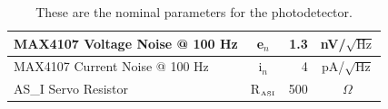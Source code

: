 \begin{table}[!h]
\begin{center}
\begin{tabular}{|l|c|r|c|}
MAX4107 Voltage Noise @ 100 Hz     & e$_n$     & 1.3     & nV/$\sqrt{\mbox{Hz}}$    \\ \hline 

MAX4107 Current Noise @ 100 Hz     & i$_n$     & 4     & pA/$\sqrt{\mbox{Hz}}$      \\ \hline 

AS\_I Servo Resistor         & R$_{\mbox{\tiny ASI}}$   & 500  & $\Omega$           \\ \hline

\end{tabular}
\end{center}
\caption[Nominal PD Parameters]{These are the nominal parameters for the photodetector.}
\label{table:PDparams}
\end{table}

